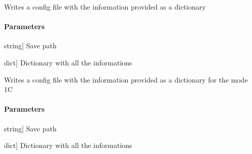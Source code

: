 \documentclass[letterpaper,10pt,english]{sphinxmanual}
\begin{document}
\begin{fulllineitems}
\label{\detokenize{functions:sir.write_config_mc}}
\pysigstartsignatures
{}
\pysigstopsignatures
\sphinxAtStartPar
Writes a config file with the information provided as a dictionary


\paragraph{Parameters}
\label{\detokenize{functions:id19}}\begin{description}
\sphinxlineitem{File}{[}string{]}
\sphinxAtStartPar
Save path

\sphinxlineitem{conf}{[}dict{]}
\sphinxAtStartPar
Dictionary with all the informations

\end{description}

\end{fulllineitems}


\begin{fulllineitems}
\label{\detokenize{functions:sir.write_config}}
\pysigstartsignatures
{}
\pysigstopsignatures
\sphinxAtStartPar
Writes a config file with the information provided as a dictionary for the mode 1C


\paragraph{Parameters}
\label{\detokenize{functions:id20}}\begin{description}
\sphinxlineitem{File}{[}string{]}
\sphinxAtStartPar
Save path

\sphinxlineitem{conf}{[}dict{]}
\sphinxAtStartPar
Dictionary with all the informations

\end{description}

\end{fulllineitems}

\end{document}
